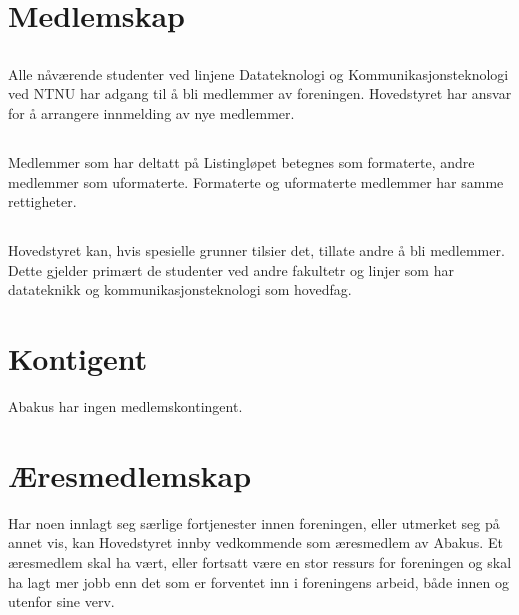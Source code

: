 \section{Medlemskap}

\subsection{}
Alle nåværende studenter ved linjene Datateknologi og Kommunikasjonsteknologi
ved NTNU har adgang til å bli medlemmer av foreningen. Hovedstyret har ansvar
for å arrangere innmelding av nye medlemmer.

\subsection{}
Medlemmer som har deltatt på Listingløpet betegnes som formaterte, andre
medlemmer som uformaterte. Formaterte og uformaterte medlemmer har samme
rettigheter.

\subsection{}
Hovedstyret kan, hvis spesielle grunner tilsier det, tillate andre å bli
medlemmer. Dette gjelder primært de studenter ved andre fakultetr og linjer
som har datateknikk og kommunikasjonsteknologi som hovedfag.

\section{Kontigent}
Abakus har ingen medlemskontingent.

\section{Æresmedlemskap}
Har noen innlagt seg særlige fortjenester innen foreningen, eller utmerket seg
på annet vis, kan Hovedstyret innby vedkommende som æresmedlem av Abakus. Et
æresmedlem skal ha vært, eller fortsatt være en stor ressurs for foreningen og
skal ha lagt mer jobb enn det som er forventet inn i foreningens arbeid, både
innen og utenfor sine verv.


